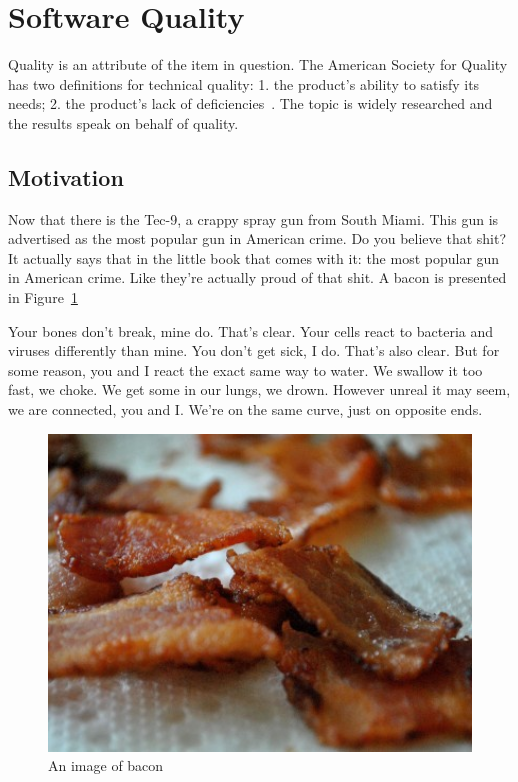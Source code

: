 \section{Software Quality}
\label{sec:software_quality}

Quality is an attribute of the item in question. The American Society for Quality has two definitions for technical quality: 1. the product's ability to satisfy its needs; 2. the product's lack of deficiencies~\cite{ASQglossary}. The topic is widely researched and the results speak on behalf of quality.~\cite{jones2011economics}

\subsection{Motivation}

Now that there is the Tec-9, a crappy spray gun from South Miami. This gun is advertised as the most popular gun in American crime. Do you believe that shit? It actually says that in the little book that comes with it: the most popular gun in American crime. Like they're actually proud of that shit. A bacon is presented in Figure~\ref{fig:bacon-image}

Your bones don't break, mine do. That's clear. Your cells react to bacteria and viruses differently than mine. You don't get sick, I do. That's also clear. But for some reason, you and I react the exact same way to water. We swallow it too fast, we choke. We get some in our lungs, we drown. However unreal it may seem, we are connected, you and I. We're on the same curve, just on opposite ends. 

\begin{figure}[t]
\begin{center}
\includegraphics[width=1.0\textwidth]{image/bacon-400-300.jpg}
\end{center}
\caption{An image of bacon}
\label{fig:bacon-image}
\end{figure}

